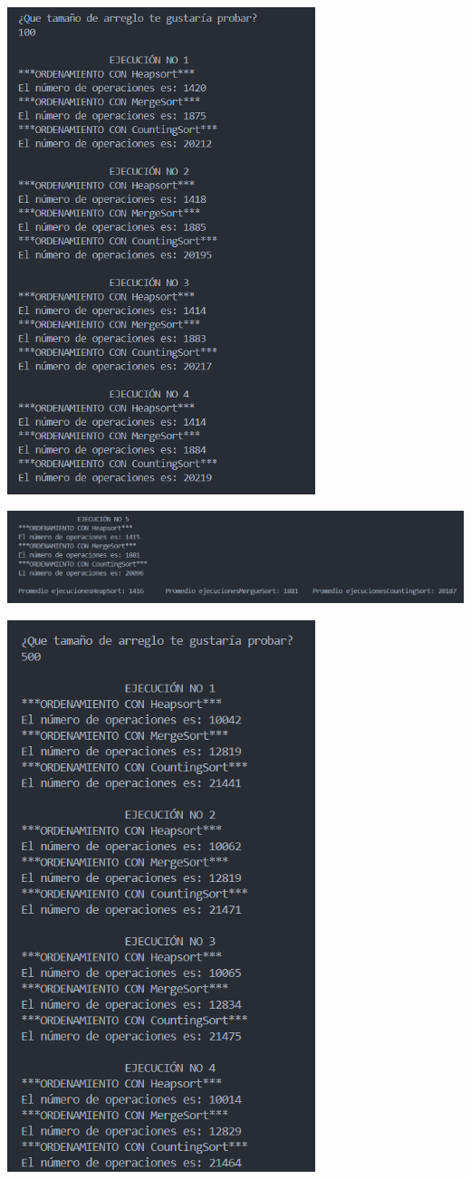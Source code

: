 \documentclass[12pt]{article}
\begin{document}
\includegraphics[width=9cm]{Images/Tam.100/1.png}
\par\vspace{0.4cm}
\includegraphics[width=16cm]{Images/Tam.100/2.png}
\par\vspace{0.4cm}
\includegraphics[width=9cm]{Images/Tam.500/1.png}
\end{document}
